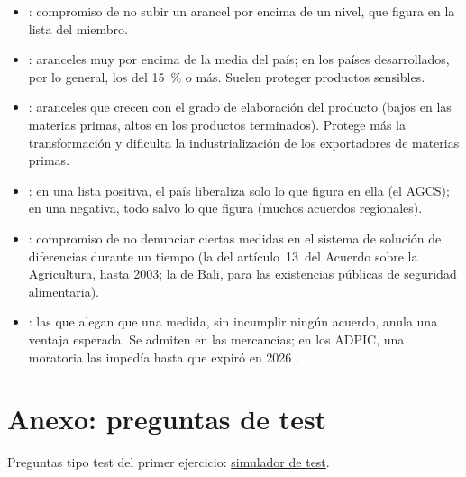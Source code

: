 \documentclass[11pt]{article}
\begin{document}
\begin{itemize}
\item {}: compromiso de no subir un arancel por encima de un nivel, que figura en la lista del miembro.
\item {}: aranceles muy por encima de la media del país; en los países desarrollados, por lo general, los del 15~\% o más. Suelen proteger productos sensibles.
\item {}: aranceles que crecen con el grado de elaboración del producto (bajos en las materias primas, altos en los productos terminados). Protege más la transformación y dificulta la industrialización de los exportadores de materias primas.
\item {}: en una lista positiva, el país liberaliza solo lo que figura en ella (el AGCS); en una negativa, todo salvo lo que figura (muchos acuerdos regionales).
\item {}: compromiso de no denunciar ciertas medidas en el sistema de solución de diferencias durante un tiempo (la del artículo~13~del Acuerdo sobre la Agricultura, hasta 2003; la de Bali, para las existencias públicas de seguridad alimentaria).
\item {}: las que alegan que una medida, sin incumplir ningún acuerdo, anula una ventaja esperada. Se admiten en las mercancías; en los ADPIC, una moratoria las impedía hasta que expiró en 2026 .
\end{itemize}

\section{Anexo: preguntas de test}\label{anexo:test}

\begin{anotaciones}
Preguntas tipo test del primer ejercicio: \href{https://www.victorgutierrezmarcos.es/oposicion/temario/primer-ejercicio/test/simulador.html?tema=3.B.33}{simulador de test}.
\end{anotaciones}

\bibliografia
\end{document}
